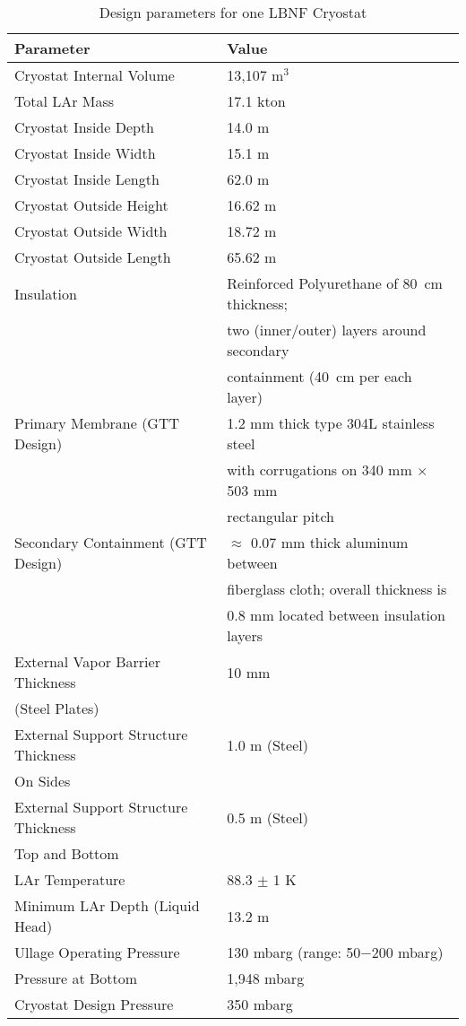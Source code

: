 \begin{table}
\caption{Design parameters for one LBNF Cryostat}
\label{table:param-summ-LBNF}
 \begin{tabular}[htbp]{|l| p{8cm} |}
\hline
\textbf{Parameter} &  \textbf{Value} \\
\hline\hline
Cryostat Internal Volume &  13,107 m$^3$ \\
\hline
Total LAr Mass & 17.1 kton \\
\hline
Cryostat Inside Depth & 14.0 m \\
\hline
Cryostat Inside Width & 15.1 m \\
\hline
Cryostat Inside Length & 62.0 m  \\
\hline
Cryostat Outside Height & 16.62 m \\
\hline
Cryostat Outside Width & 18.72 m \\
\hline
Cryostat Outside Length & 65.62 m \\
\hline
Insulation &  Reinforced Polyurethane of 80~cm thickness; \\
           &  two (inner/outer) layers around secondary \\
           &  containment (40~cm per each layer) \\ 
\hline
Primary Membrane (GTT Design) & 1.2 mm thick type 304L stainless steel \\
                              & with corrugations on 340 mm $\times$ 503 mm \\
                       & rectangular pitch\\
\hline
Secondary Containment (GTT Design) & $\approx$ 0.07 mm thick aluminum between \\ 
                            & fiberglass cloth; overall thickness is \\
                            & 0.8 mm located between insulation layers \\
\hline
External Vapor Barrier Thickness & 10 mm \\
(Steel Plates)                   &       \\
\hline
External Support Structure Thickness & 1.0 m (Steel) \\
On Sides & \\
\hline
External Support Structure Thickness & 0.5 m (Steel) \\
Top and Bottom & \\
\hline
LAr Temperature & 88.3 $\pm$ 1 K \\
\hline
Minimum LAr Depth (Liquid Head) & 13.2 m \\
\hline
Ullage Operating Pressure & 130 mbarg (range: 50$-$200 mbarg) \\
\hline
Pressure at Bottom & 1,948 mbarg \\
\hline 
Cryostat Design Pressure & 350 mbarg \\
\hline
\end{tabular} 
\end{table}


